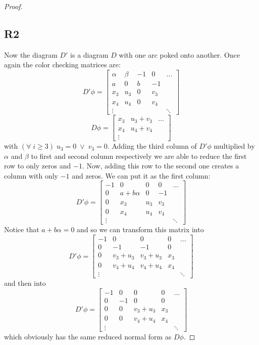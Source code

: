 \begin{proof}
  \subsection*{\centering R2}

  Now the diagram $D'$ is a diagram $D$ with one arc poked onto another. Once again 
  the color checking matrices are:
  $$
  D'\phi=
  \begin{bmatrix}
    \alpha & \beta & -1 & 0 & \hdots \\ 
    a & 0 & b & -1  \\ 
    x_3 & u_3 & 0 & v_3 \\ 
    x_4 & u_4 & 0 & v_4 \\ 
    \vdots & & & & \ddots
  \end{bmatrix}
  $$
  $$
  D\phi= 
  \begin{bmatrix}
    x_3 & u_3 + v_3 & \hdots \\ 
    x_4 & u_4 + v_4 \\ 
    \vdots
  \end{bmatrix}
  $$
  with $(\forall\;i\geq 3)\;u_3=0\;\lor\;v_3=0$. Adding the third column of $D'\phi$ multiplied by $\alpha$ and $\beta$ to first and second column respectively we are able to reduce the first row to only zeros and $-1$. Now, adding this row to the second one creates a column with only $-1$ and zeros. We can put it as the first column:
  $$
  D'\phi=
  \begin{bmatrix}
    -1 & 0 & 0 & 0 & \hdots \\ 
    0 & a +b\alpha & 0 & -1  \\ 
    0 & x_3 & u_3 & v_3 \\ 
    0 & x_4 & u_4 & v_4 \\ 
    \vdots & & & & \ddots
  \end{bmatrix}
  $$
  Notice that $a+b\alpha=0$ and so we can transform this matrix into
  $$
  D'\phi=
  \begin{bmatrix}
    -1 & 0 & 0 & 0 & \hdots \\ 
    0 & -1 & -1 & 0  \\ 
    0 & v_3 +u_3 & v_3+u_3&  x_3 & \\ 
    0 & v_4 +u_4 & v_4+u_4 & x_4 \\ 
    \vdots & & & & \ddots
  \end{bmatrix}
  $$
  and then into 
  $$
  D'\phi=
  \begin{bmatrix}
    -1 & 0 & 0 & 0 & \hdots \\ 
    0 & -1 & 0 & 0  \\ 
    0 & 0 & v_3+u_3&  x_3 & \\ 
    0 & 0 & v_4+u_4 & x_4 \\ 
    \vdots & & & & \ddots
  \end{bmatrix}
  $$
  which obviously has the same reduced normal form as $D\phi$.


\end{proof}
